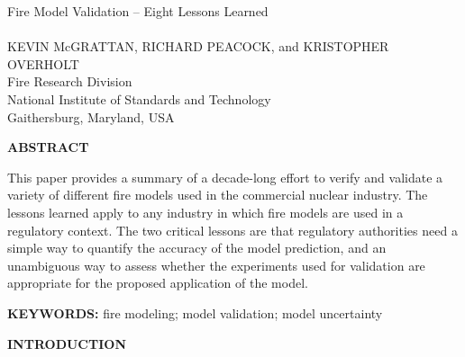 \documentclass[fleqn,b5paper]{article}
\begin{document}
\renewcommand{\thefootnote}{\sf \arabic{footnote}}
\renewcommand{\d}{\mathrm{d}}
\renewcommand{\labelitemi}{{\scriptsize $\bullet$}}
\renewcommand{\labelitemii}{{\scriptsize $\bullet$}}




\begin{flushleft}
{\helvb Fire Model Validation -- Eight Lessons Learned}\\
\hspace{1in}\\
\helvn KEVIN McGRATTAN\footnotemark[1], RICHARD PEACOCK\footnotemark[1], and KRISTOPHER OVERHOLT\footnotemark[1]  \\
\footnotemark[1] Fire Research Division \\
National Institute of Standards and Technology \\
Gaithersburg, Maryland, USA
\end{flushleft}
\rm

\vspace{\parskip}
{\bf ABSTRACT}

This paper provides a summary of a decade-long effort to verify and validate a variety of different fire models used in the commercial nuclear industry. The lessons learned apply to any industry in which fire models are used in a regulatory context. The two critical lessons are that regulatory authorities need a simple way to quantify the accuracy of the model prediction, and an unambiguous way to assess whether the experiments used for validation are appropriate for the proposed application of the model.

\vspace{\parskip}
{\bf KEYWORDS:} fire modeling; model validation; model uncertainty

\vspace{\parskip}
{\bf INTRODUCTION}
\end{document}
